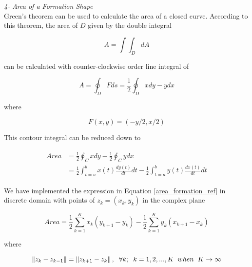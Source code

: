 \textit{ 	4- Area of a Formation Shape} \\ 		
Green's theorem can be used to calculate the area of a closed curve. According to this theorem, the area of $D$ given by the double integral \cite{calculus}

\begin{equation}
 A = \int\int_D dA
\end{equation}
		
can be calculated with counter-clockwise order line integral of

\begin{equation}
 A = \oint_D F ds = \frac{1}{2} \oint_D xdy - ydx
\end{equation}

where

\begin{equation}
F(x,y) = (-y/2,x/2)
\end{equation}
		
This contour integral can be reduced down to

\begin{align} \label{area_formation_ref}
\begin{split}
Area &= \frac{1}{2} \oint_C xdy - \frac{1}{2} \oint_C ydx \\
&= \frac{1}{2} \int_{t=a}^{b} x(t)\frac{dy(t)}{dt}dt - \frac{1}{2} \int_{t=a}^{b}y(t)\frac{dx(t)}{dt}dt
\end{split}
\end{align}
		
We have implemented the expression in Equation \ref{area_formation_ref} in discrete domain with points of  $z_k = (x_k,y_k)$ in the complex plane
			
\begin{equation}
Area = \frac{1}{2} \sum_{k=1}^{K} x_k(y_{k+1} - y_k) - \frac{1}{2} \sum_{k=1}^{K}y_k(x_{k+1} - x_k)
\end{equation}
			
where

\begin{equation}
\left\lVert z_k - z_{k-1}\right\rVert = \left\lVert z_{k+1} - z_k\right\rVert, \hspace{0.2cm}  \forall k ;  \hspace{0.2cm} k=1,2,...,K \hspace{0.2cm} when  \hspace{0.2cm} K \to\infty
\end{equation}

